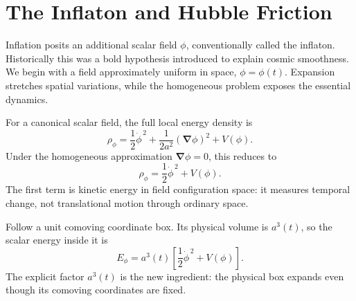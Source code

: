 \section{The Inflaton and Hubble Friction}

Inflation posits an additional scalar field \(\phi\), conventionally called the inflaton. Historically this was a bold hypothesis introduced to explain cosmic smoothness. We begin with a field approximately uniform in space, \(\phi=\phi(t)\). Expansion stretches spatial variations, while the homogeneous problem exposes the essential dynamics.

For a canonical scalar field, the full local energy density is
\begin{equation}
\rho_\phi
=
\frac12\dot\phi^{\,2}
+\frac{1}{2a^2}(\boldsymbol\nabla\phi)^2
+V(\phi).
\end{equation}
Under the homogeneous approximation \(\boldsymbol\nabla\phi=0\), this reduces to
\begin{equation}
\rho_\phi=\frac12\dot\phi^{\,2}+V(\phi).
\label{eq:c08-scalar-density}
\end{equation}
The first term is kinetic energy in field configuration space: it measures temporal change, not translational motion through ordinary space.

\begin{classroomqa}
\end{classroomqa}

Follow a unit comoving coordinate box. Its physical volume is \(a^3(t)\), so the scalar energy inside it is
\begin{equation}
E_\phi
=a^3(t)
\left[
\frac12\dot\phi^{\,2}+V(\phi)
\right].
\end{equation}
The explicit factor \(a^3(t)\) is the new ingredient: the physical box expands even though its comoving coordinates are fixed.

\begin{classroomqa}
\end{classroomqa}


